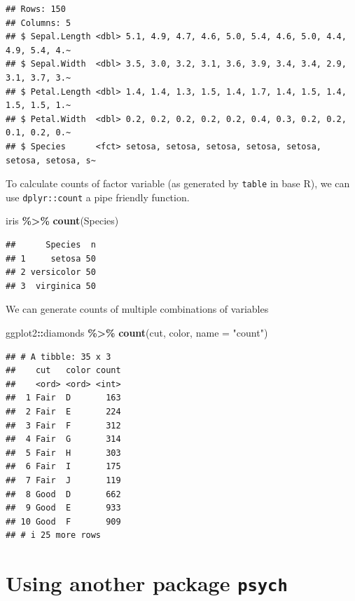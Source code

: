 \documentclass[
]{book}
\newenvironment{Shaded}{\begin{snugshade}}{\end{snugshade}}
\newcommand{\AttributeTok}[1]{\textcolor[rgb]{0.13,0.29,0.53}{#1}}
\newcommand{\FunctionTok}[1]{\textcolor[rgb]{0.13,0.29,0.53}{\textbf{#1}}}
\newcommand{\NormalTok}[1]{#1}
\newcommand{\SpecialCharTok}[1]{\textcolor[rgb]{0.81,0.36,0.00}{\textbf{#1}}}
\newcommand{\StringTok}[1]{\textcolor[rgb]{0.31,0.60,0.02}{#1}}
\begin{document}
\begin{verbatim}
## Rows: 150
## Columns: 5
## $ Sepal.Length <dbl> 5.1, 4.9, 4.7, 4.6, 5.0, 5.4, 4.6, 5.0, 4.4, 4.9, 5.4, 4.~
## $ Sepal.Width  <dbl> 3.5, 3.0, 3.2, 3.1, 3.6, 3.9, 3.4, 3.4, 2.9, 3.1, 3.7, 3.~
## $ Petal.Length <dbl> 1.4, 1.4, 1.3, 1.5, 1.4, 1.7, 1.4, 1.5, 1.4, 1.5, 1.5, 1.~
## $ Petal.Width  <dbl> 0.2, 0.2, 0.2, 0.2, 0.2, 0.4, 0.3, 0.2, 0.2, 0.1, 0.2, 0.~
## $ Species      <fct> setosa, setosa, setosa, setosa, setosa, setosa, setosa, s~
\end{verbatim}

To calculate counts of factor variable (as generated by \texttt{table} in base R), we can use \texttt{dplyr::count} a pipe friendly function.

\begin{Shaded}
\begin{Highlighting}[]
\NormalTok{iris }\SpecialCharTok{\%\textgreater{}\%} 
  \FunctionTok{count}\NormalTok{(Species)}
\end{Highlighting}
\end{Shaded}

\begin{verbatim}
##      Species  n
## 1     setosa 50
## 2 versicolor 50
## 3  virginica 50
\end{verbatim}

We can generate counts of multiple combinations of variables

\begin{Shaded}
\begin{Highlighting}[]
\NormalTok{ggplot2}\SpecialCharTok{::}\NormalTok{diamonds }\SpecialCharTok{\%\textgreater{}\%} 
  \FunctionTok{count}\NormalTok{(cut, color, }\AttributeTok{name =} \StringTok{"count"}\NormalTok{)}
\end{Highlighting}
\end{Shaded}

\begin{verbatim}
## # A tibble: 35 x 3
##    cut   color count
##    <ord> <ord> <int>
##  1 Fair  D       163
##  2 Fair  E       224
##  3 Fair  F       312
##  4 Fair  G       314
##  5 Fair  H       303
##  6 Fair  I       175
##  7 Fair  J       119
##  8 Good  D       662
##  9 Good  E       933
## 10 Good  F       909
## # i 25 more rows
\end{verbatim}

\hypertarget{using-another-package-psych}{%
\section{\texorpdfstring{Using another package \texttt{psych}}{Using another package psych}}\label{using-another-package-psych}}
\end{document}
